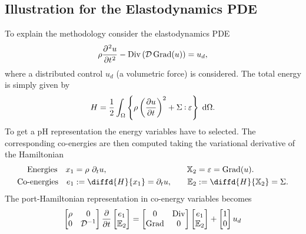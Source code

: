 \subsection{Illustration for the Elastodynamics PDE}
To explain the methodology consider the elastodynamics PDE
\begin{equation*}
\rho \diffp[2]{u}{t} - \Div\left(\mathcal{D} \Grad(u)\right) = u_d,
\end{equation*}
where a distributed control $u_d$ (a volumetric force) is considered.
The total energy is simply given by 
\[\displaystyle H = \frac{1}{2} \int_{\Omega} \left\{\rho \left(\diffp{u}{t}\right)^2 + \Sigma \cddot \varepsilon \right\} \d{\Omega}.
\]
To get a pH representation the energy variables have to selected. The corresponding co-energies are then computed taking the variational derivative of the Hamiltonian
\begin{equation}
\begin{aligned}
\text{Energies} \quad  x_1 &= \rho \ \partial_t {u}, \\
\text{Co-energies} \quad e_1 &:= \diffd{H}{x_1} =  \partial_t {u}, \\
\end{aligned} \qquad
\begin{aligned}
\mathbb{X}_2 &= \varepsilon = \Grad(u). \\
\mathbb{E}_2 &:= \diffd{H}{\mathbb{X}_2} = \Sigma.
\end{aligned}
\end{equation}
The port-Hamiltonian representation in co-energy variables becomes
\begin{equation*}
\begin{bmatrix}
\rho & 0 \\ 0 & \mathcal{D}^{-1} \\
\end{bmatrix}
\diffp{}{t}
\begin{bmatrix}
e_1 \\ \mathbb{E}_2 \\
\end{bmatrix} = 
\begin{bmatrix}
0 & \Div \\ \Grad & 0 \\
\end{bmatrix}
\begin{bmatrix}
e_1 \\ \mathbb{E}_2 \\
\end{bmatrix} + 
\begin{bmatrix}
1 \\ 0 \\
\end{bmatrix} u_d 
\end{equation*}
